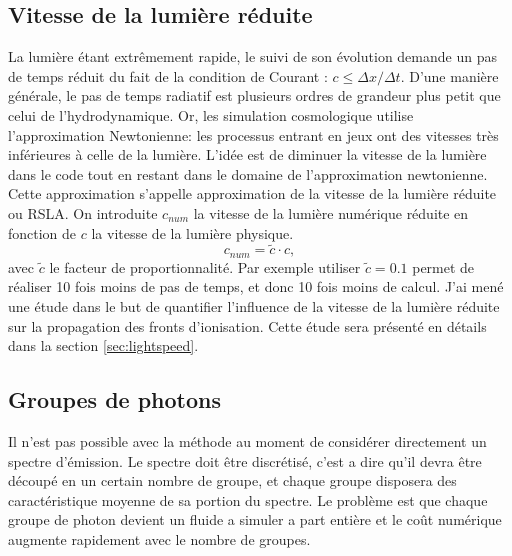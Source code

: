 \subsection{Vitesse de la lumière réduite}
\label{sec:RSLA}

La lumière étant extrêmement rapide, le suivi de son évolution demande un pas de temps réduit du fait de la condition de Courant : $ c \leq \Delta x / \Delta t $.
D'une manière générale, le pas de temps radiatif est plusieurs ordres de grandeur plus petit que celui de l'hydrodynamique.
Or, les simulation cosmologique utilise l'approximation Newtonienne: les processus entrant en jeux ont des vitesses très inférieures à celle de la lumière.
L'idée est de diminuer la vitesse de la lumière dans le code tout en restant dans le domaine de l'approximation newtonienne.
Cette approximation s'appelle approximation de la vitesse de la lumière réduite ou \ac{RSLA}.
On introduite $c_{num}$ la vitesse de la lumière numérique réduite en fonction de $c$ la vitesse de la lumière physique.
\begin{equation}
c_{num} = \tilde{c} \cdot{c},
\end{equation}
avec $\tilde{c}$ le facteur de proportionnalité. 
Par exemple utiliser $\tilde{c}=0.1$ permet de réaliser 10 fois moins de pas de temps, et donc 10 fois moins de calcul.
J'ai mené une étude dans le but de quantifier l'influence de la vitesse de la lumière réduite sur la propagation des fronts d'ionisation.
Cette étude sera présenté en détails dans la section \ref{sec:lightspeed}.

\subsection{Groupes de photons}
\label{sec:groupedephotons}

Il n'est pas possible avec la méthode au moment de considérer directement un spectre d'émission.
Le spectre doit être discrétisé, c'est a dire qu'il devra être découpé en un certain nombre de groupe, et chaque groupe disposera des caractéristique moyenne de sa portion du spectre.
Le problème est que chaque groupe de photon devient un fluide a simuler a part entière et le coût numérique augmente rapidement avec le nombre de groupes. 

